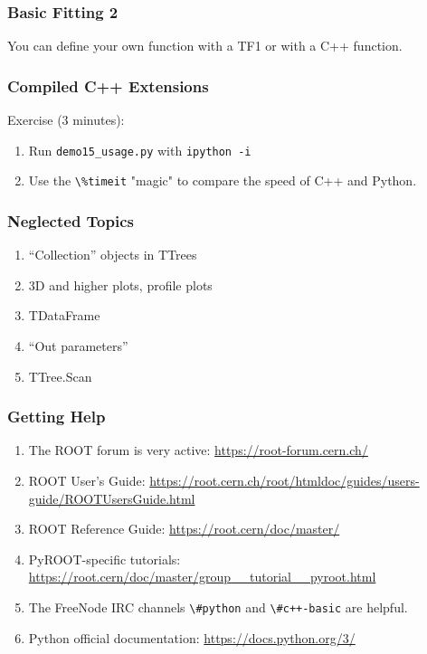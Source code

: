 \documentclass{beamer}
\begin{document}
\begin{frame}\frametitle{Basic Fitting 2}
You can define your own function with a TF1 or with a C++ function.

\end{frame}

\begin{frame}\frametitle{Compiled C++ Extensions}


Exercise (3 minutes):
\begin{enumerate}
\item Run \lstinline$demo15_usage.py$ with \lstinline$ipython -i$
\item Use the \lstinline$\%timeit$ "magic" to compare the speed of C++ and Python.
\end{enumerate}
\end{frame}

\begin{frame}\frametitle{Neglected Topics}
\begin{enumerate}
\item ``Collection'' objects in TTrees
\item 3D and higher plots, profile plots
\item TDataFrame
\item ``Out parameters''
\item TTree.Scan
\end{enumerate}
\end{frame}

\begin{frame}\frametitle{Getting Help}
\begin{enumerate}
\item The ROOT forum is very active: \url{https://root-forum.cern.ch/}
\item ROOT User's Guide: \url{https://root.cern.ch/root/htmldoc/guides/users-guide/ROOTUsersGuide.html}
\item ROOT Reference Guide: \url{https://root.cern/doc/master/}
\item PyROOT-specific tutorials:\\ \small{\url{https://root.cern/doc/master/group__tutorial__pyroot.html}}
\item The FreeNode IRC channels \lstinline$\#python$ and \lstinline$\#c++-basic$ are helpful.
\item Python official documentation: \url{https://docs.python.org/3/}
\end{enumerate}
\end{frame}
\end{document}
